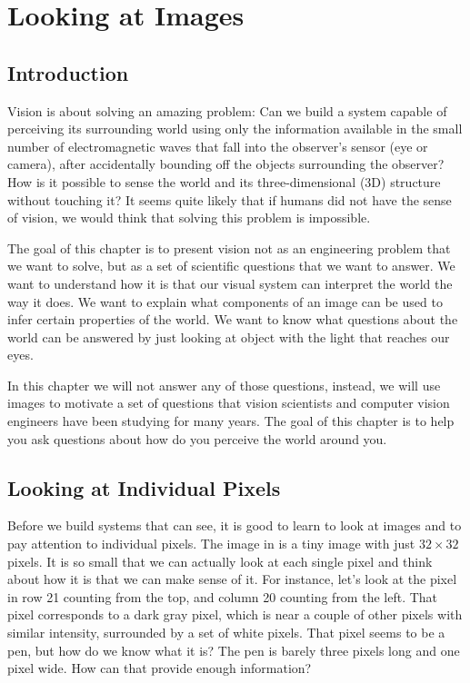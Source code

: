 %	
%	
%	 
%



\chapter{Looking at Images}
\label{chap:looking_at_images}

\section{Introduction}

Vision is about solving an amazing problem: Can we build a system capable of perceiving its surrounding world using only the information available in the small number of electromagnetic waves that fall into the observer’s sensor (eye or camera), after accidentally bounding off the objects surrounding the observer? How is it possible to sense the world and its three-dimensional (3D) structure without touching it? It seems quite likely that if humans did not have the sense of vision, we would think that solving this problem is impossible.

The goal of this chapter is to present vision not as an engineering problem that we want to solve, but as a set of scientific questions that we want to answer. We want to understand how it is that our visual system can interpret the world the way it does. We want to explain what components of an image can be used to infer certain properties of the world. We want to know what questions about the world can be answered by just looking at object with the light that reaches our eyes.

In this chapter we will not answer any of those questions, instead, we will use images to motivate a set of questions that vision scientists and computer vision engineers have been studying for many years. The goal of this chapter is to help you ask questions about how do you perceive the world around you.

\section{Looking at Individual Pixels}


Before we build systems that can see, it is good to learn to look at images and to pay attention to individual pixels.
The image in \fig{\ref{fig:pexels-retha-ferguson}} is a tiny image with just $32 \times 32$ pixels.
It is so small that we can actually look at each single pixel and think about how it is that we can make sense of it. For instance, let's look at the pixel in row 21 counting from the top, and column 20 counting from the left. That pixel corresponds to a dark gray pixel, which is near a couple of other pixels with similar intensity, surrounded by a set of white pixels. That pixel seems to be a pen, but how do we know what it is? The pen is barely three pixels long and one pixel wide. How can that provide enough information?

